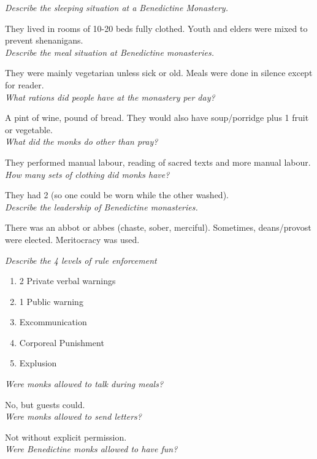 \documentclass[12pt]{article}
\begin{document}
\textit{Describe the sleeping situation at a Benedictine Monastery.}

They lived in rooms of 10-20 beds fully clothed. Youth and elders were mixed to prevent shenanigans.\\

\textit{Describe the meal situation at Benedictine monasteries.}

They were mainly vegetarian unless sick or old. Meals were done in silence except for reader.\\

\textit{What rations did people have at the monastery per day?}

A pint of wine, pound of bread. They would also have soup/porridge plus 1 fruit or vegetable.\\

\textit{What did the monks do other than pray?}

They performed manual labour, reading of sacred texts and more manual labour.\\

\textit{How many sets of clothing did monks have?}

They had 2 (so one could be worn while the other washed).\\

\textit{Describe the leadership of Benedictine monasteries.}

There was an abbot or abbes (chaste, sober, merciful). Sometimes, deans/provost were elected. Meritocracy was used.

\textit{Describe the 4 levels of rule enforcement}

\begin{enumerate}
	\item 2 Private verbal warnings
	\item 1 Public warning
	\item Excommunication
	\item Corporeal Punishment
	\item Explusion
\end{enumerate}

\textit{Were monks allowed to talk during meals?}

No, but guests could.\\

\textit{Were monks allowed to send letters?}

Not without explicit permission.\\

\textit{Were Benedictine monks allowed to have fun?}
\end{document}
